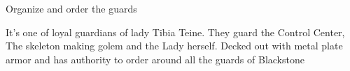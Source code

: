 {
\item Organize and order the guards
}
{
	It's one of loyal guardians of lady Tibia Teine. They guard the Control Center, The skeleton making golem and the Lady herself. Decked out with metal plate armor and has authority to order around all the guards of Blackstone
}